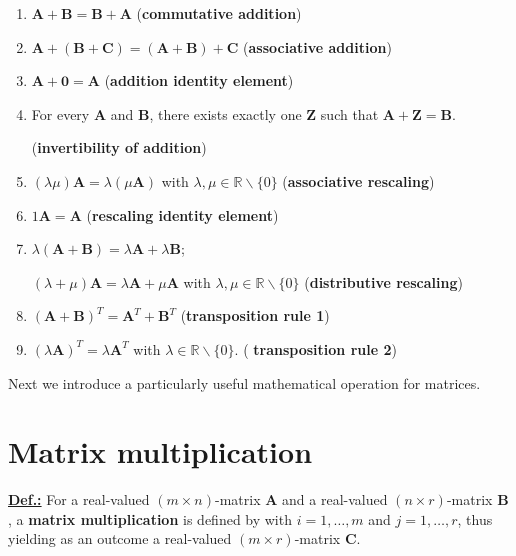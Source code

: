 \begin{enumerate}
	\item $\mathbf{A}+\mathbf{B} = \mathbf{B}+\mathbf{A}$
	\hfill ({\bf commutative addition})
	\item $\mathbf{A}+(\mathbf{B}+\mathbf{C})
	= (\mathbf{A}+\mathbf{B})+\mathbf{C}$
	\hfill ({\bf associative addition})
	\item $\mathbf{A}+\mathbf{0} = \mathbf{A}$
	\hfill ({\bf addition identity element})
	\item For every $\mathbf{A}$ and $\mathbf{B}$, there exists 
	exactly one $\mathbf{Z}$ such that 
	$\mathbf{A}+\mathbf{Z}=\mathbf{B}$.
	
	\hfill ({\bf invertibility of addition})
	\item $(\lambda\mu)\mathbf{A}=\lambda(\mu\mathbf{A})$
	with $\lambda,\mu	\in \mathbb{R} \backslash \{0\}$ 
	\hfill ({\bf associative rescaling})
	\item $1\mathbf{A}=\mathbf{A}$
	\hfill ({\bf rescaling identity element})
	\item $\lambda(\mathbf{A}+\mathbf{B})
	= \lambda\mathbf{A}+\lambda\mathbf{B}$;
	
	$(\lambda+\mu)\mathbf{A} = \lambda\mathbf{A}+\mu\mathbf{A}$
	with $\lambda, \mu	\in \mathbb{R} \backslash \{0\}$
	\hfill ({\bf distributive rescaling})
	
	\item $(\mathbf{A}+\mathbf{B})^{T} = \mathbf{A}^{T} + 
	\mathbf{B}^{T}$ \hfill ({\bf transposition rule 1})
	
	\item $(\lambda\mathbf{A})^{T} = \lambda\mathbf{A}^{T}$ with 
	$\lambda \in \mathbb{R} \backslash \{0\}$. \hfill ({\bf 
	transposition rule 2})
\end{enumerate}

\medskip
\noindent
Next we introduce a particularly useful mathematical operation for 
matrices.

\section[Matrix multiplication]%
{Matrix multiplication}

\noindent
\underline{\bf Def.:}
For a real-valued $(m \times n)$-matrix $\mathbf{A}$ and a 
real-valued $(n \times r)$-matrix $\mathbf{B}$, a {\bf matrix 
multiplication} is defined by
%
\be
{}
\ee
%
with $i=1,\ldots,m$ and $j=1,\ldots,r$, thus yielding as an 
outcome a real-valued $(m \times r)$-matrix $\mathbf{C}$.

